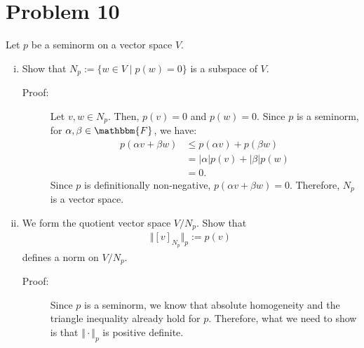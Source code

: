 \documentclass[10pt]{extarticle}
\begin{document}
  \section{Problem 10}%
  Let $p$ be a seminorm on a vector space $V$.
  \begin{enumerate}[(i)]
    \item Show that $N_p := \{w\in V\mid p(w)=0\}$ is a subspace of $V$.
      \begin{description}
        \item[Proof:] Let $v,w\in N_p$. Then, $p(v) = 0$ and $p(w) = 0$. Since $p$ is a seminorm, for $\alpha,\beta\in \mathbbm{F}$, we have:
          \begin{align*}
            p(\alpha v + \beta w) &\leq p(\alpha v) + p(\beta w)\\
                                  &= |\alpha| p(v) + |\beta|p(w)\\
                                  &= 0.
          \end{align*}
          Since $p$ is definitionally non-negative, $p(\alpha v + \beta w) = 0$. Therefore, $N_p$ is a vector space.
      \end{description}
    \item We form the quotient vector space $V/N_p$. Show that
      \begin{align*}
        \Vert [v]_{N_p}\Vert_{p} := p(v)
      \end{align*}
      defines a norm on $V/N_p$.
      \begin{description}
        \item[Proof:] Since $p$ is a seminorm, we know that absolute homogeneity and the triangle inequality already hold for $p$. Therefore, what we need to show is that $\Vert \cdot \Vert_{p}$ is positive definite.\\


\end{description}
\end{enumerate}
\end{document}
